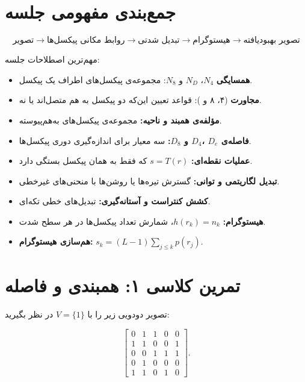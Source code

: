 \documentclass[11pt,a4paper]{article}
\begin{document}
	
	\section{جمع‌بندی مفهومی جلسه}
	
	\[
	\boxed{
		\text{تصویر}
		\rightarrow
		\text{روابط مکانی پیکسل‌ها}
		\rightarrow
		\text{تبدیل شدتی}
		\rightarrow
		\text{هیستوگرام}
		\rightarrow
		\text{تصویر بهبودیافته}
	}
	\]
	
	مهم‌ترین اصطلاحات جلسه:
	
	\begin{itemize}
		\item \textbf{همسایگی} $N_4$، $N_D$ و $N_8$:
		مجموعه‌ی پیکسل‌های اطراف یک پیکسل.
		
		\item \textbf{مجاورت} (۴، ۸ و ):
		قواعد تعیین این‌که دو پیکسل به هم متصل‌اند یا نه.
		
		\item \textbf{مؤلفه‌ی همبند و ناحیه:}
		مجموعه‌ی پیکسل‌های به‌هم‌پیوسته.
		
		\item \textbf{فاصله‌ی $D_e$ ،$D_4$ و $D_8$:}
		سه معیار برای اندازه‌گیری دوری پیکسل‌ها.
		
		\item \textbf{عملیات نقطه‌ای:}
		$s=T(r)$ که فقط به همان پیکسل بستگی دارد.
		
		\item \textbf{تبدیل لگاریتمی و توانی:}
		گسترش تیره‌ها یا روشن‌ها با منحنی‌های غیرخطی.
		
		\item \textbf{کشش کنتراست و آستانه‌گیری:}
		تبدیل‌های خطی تکه‌ای.
		
		\item \textbf{هیستوگرام:}
		$h(r_k)=n_k$، شمارش تعداد پیکسل‌ها در هر سطح شدت.
		
		\item \textbf{هم‌سازی هیستوگرام:}
		$s_k=(L-1)\sum_{j\leq k}p(r_j)$.
	\end{itemize}
	
	
	\section{تمرین کلاسی ۱: همبندی و فاصله}
	
	تصویر دودویی زیر را با $V=\{1\}$ در نظر بگیرید:
	
	\[
	\begin{bmatrix}
		0 & 1 & 1 & 0 & 0\\
		1 & 1 & 0 & 0 & 1\\
		0 & 0 & 1 & 1 & 1\\
		0 & 1 & 0 & 0 & 0\\
		1 & 1 & 0 & 1 & 0
	\end{bmatrix}.
	\]
	
\end{document}
